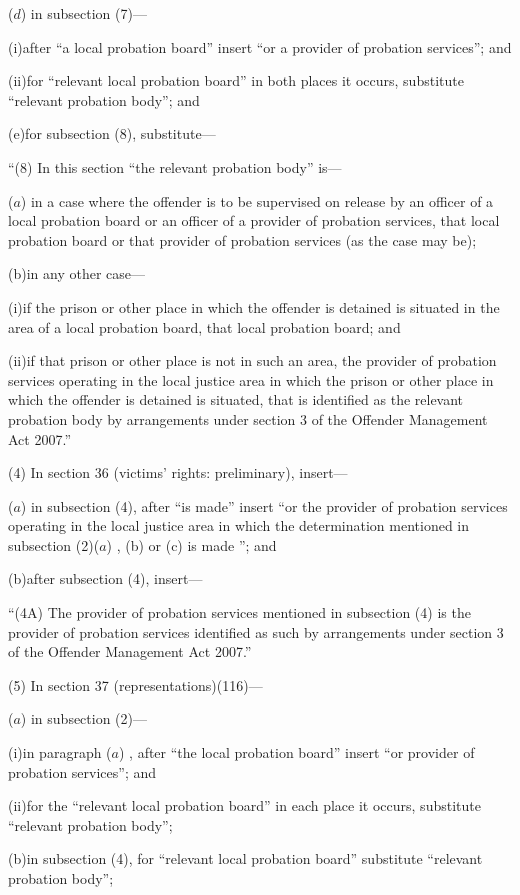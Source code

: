 \documentclass[12pt,a4paper]{article}
\begin{document}
($d$) in subsection (7)—

(i)after “a local probation board” insert “or a provider of probation services”; and

(ii)for “relevant local probation board” in both places it occurs, substitute “relevant probation body”; and

(e)for subsection (8), substitute—

“(8) In this section “the relevant probation body” is—

($a$) in a case where the offender is to be supervised on release by an officer of a local probation board or an officer of a provider of probation services, that local probation board or that provider of probation services (as the case may be);

(b)in any other case—

(i)if the prison or other place in which the offender is detained is situated in the area of a local probation board, that local probation board; and

(ii)if that prison or other place is not in such an area, the provider of probation services operating in the local justice area in which the prison or other place in which the offender is detained is situated, that is identified as the relevant probation body by arrangements under section 3 of the Offender Management Act 2007.”

(4) In section 36 (victims’ rights: preliminary), insert—

($a$) in subsection (4), after “is made” insert “or the provider of probation services operating in the local justice area in which the determination mentioned in subsection (2)($a$) , (b) or (c) is made ”; and

(b)after subsection (4), insert—

“(4A) The provider of probation services mentioned in subsection (4) is the provider of probation services identified as such by arrangements under section 3 of the Offender Management Act 2007.”

(5) In section 37 (representations)(116)—

($a$) in subsection (2)—

(i)in paragraph ($a$) , after “the local probation board” insert “or provider of probation services”; and

(ii)for the “relevant local probation board” in each place it occurs, substitute “relevant probation body”;

(b)in subsection (4), for “relevant local probation board” substitute “relevant probation body”;
\end{document}

